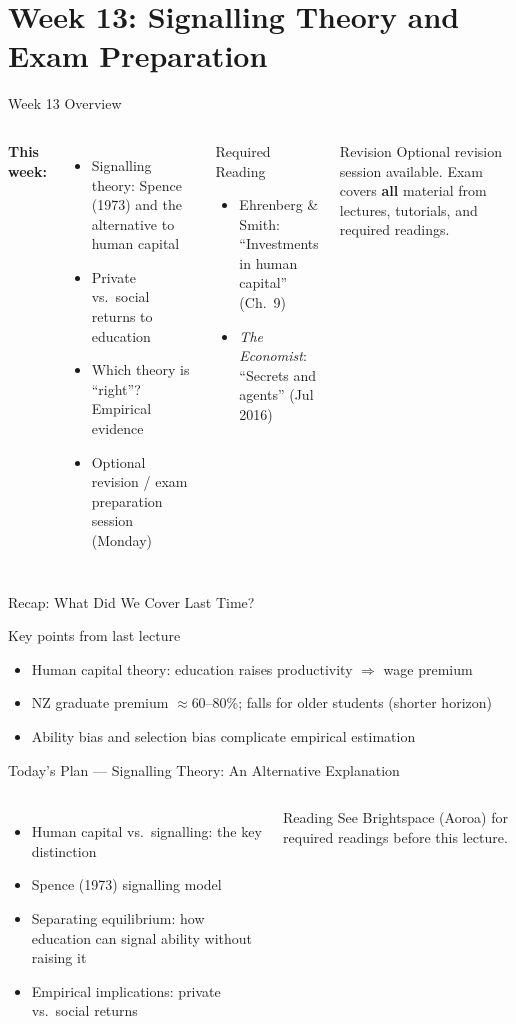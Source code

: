 \documentclass[aspectratio=169, 12pt]{beamer}
\newcommand{\recapslide}[1]{%
  \begin{frame}{Recap: What Did We Cover Last Time?}
    \begin{block}{Key points from last lecture}
      \begin{itemize}#1\end{itemize}
    \end{block}
  \end{frame}}
\newcommand{\planslide}[2]{%
  \begin{frame}{Today's Plan — #1}
    \begin{columns}
      \column{0.6\textwidth}
      \begin{itemize}#2\end{itemize}
      \column{0.38\textwidth}
      \begin{alertblock}{Reading}
        \footnotesize See Brightspace (Aoroa) for required readings before this lecture.
      \end{alertblock}
    \end{columns}
  \end{frame}}
\begin{document}
\section{Week 13: Signalling Theory and Exam Preparation}

\begin{frame}{Week 13 Overview}
  \begin{columns}
      \textbf{This week:}
      \begin{itemize}
        \item Signalling theory: Spence (1973) and the alternative to human capital
        \item Private vs.\ social returns to education
        \item Which theory is ``right''? Empirical evidence
        \item Optional revision / exam preparation session (Monday)
      \end{itemize}
      \begin{block}{Required Reading}
        {\small
        \begin{itemize}
          \item Ehrenberg \& Smith: ``Investments in human capital'' (Ch.\ 9)
          \item \textit{The Economist}: ``Secrets and agents'' (Jul 2016)
        \end{itemize}}
      \end{block}
      \begin{alertblock}{Revision}
        Optional revision session available. Exam covers \textbf{all} material from lectures,
        tutorials, and required readings.
      \end{alertblock}
  \end{columns}
\end{frame}

\recapslide{
  \item Human capital theory: education raises productivity $\Rightarrow$ wage premium
  \item NZ graduate premium $\approx$60--80\%; falls for older students (shorter horizon)
  \item Ability bias and selection bias complicate empirical estimation
}

\planslide{Signalling Theory: An Alternative Explanation}{
  \item Human capital vs.\ signalling: the key distinction
  \item Spence (1973) signalling model
  \item Separating equilibrium: how education can signal ability without raising it
  \item Empirical implications: private vs.\ social returns
}
\end{document}
